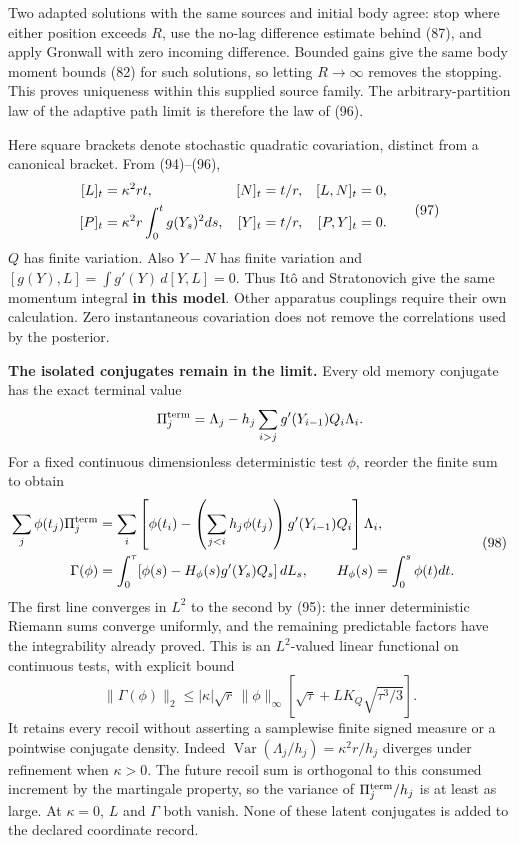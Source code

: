 \documentclass[11pt,a4paper]{article}
\begin{document}
Two adapted solutions with the same sources and initial body agree: stop
where either position exceeds \(R\), use the no-lag difference estimate
behind (87), and apply Gronwall with zero incoming difference. Bounded
gains give the same body moment bounds (82) for such solutions, so
letting \(R\to\infty\) removes the stopping. This proves uniqueness
within this supplied source family. The arbitrary-partition law of the
adaptive path limit is therefore the law of (96).

Here square brackets denote stochastic quadratic covariation, distinct
from a canonical bracket. From (94)--(96), \[\begin{aligned}
\relax[L]_t&=\kappa^2rt,&[N]_t&=t/r,&[L,N]_t&=0,\\
[P]_t&=\kappa^2r\int_0^t g(Y_s)^2ds,&
[Y]_t&=t/r,&[P,Y]_t&=0.
\end{aligned}\tag{97}\] \(Q\) has finite variation. Also \(Y-N\) has
finite variation and \([g(Y),L]=\int g'(Y)\,d[Y,L]=0\). Thus Itô and
Stratonovich give the same momentum integral \textbf{in this model}.
Other apparatus couplings require their own calculation. Zero
instantaneous covariation does not remove the correlations used by the
posterior.

\textbf{The isolated conjugates remain in the limit.} Every old memory
conjugate has the exact terminal value \[\Pi_j^{\rm term}=\Lambda_j-
 h_j\sum_{i>j}g'(Y_{i-1})Q_i\Lambda_i.\] For a fixed continuous
dimensionless deterministic test \(\phi\), reorder the finite sum to
obtain \[\begin{aligned}
\sum_j\phi(t_j)\Pi_j^{\rm term}
 &=\sum_i\left[\phi(t_i)-
 \left(\sum_{j<i}h_j\phi(t_j)\right)g'(Y_{i-1})Q_i\right]\Lambda_i,\\
\Gamma(\phi)&=\int_0^\tau
 [\phi(s)-H_\phi(s)g'(Y_s)Q_s]\,dL_s,
 \qquad H_\phi(s)=\int_0^s\phi(t)dt.
\end{aligned}\tag{98}\] The first line converges in \(L^2\) to the
second by (95): the inner deterministic Riemann sums converge uniformly,
and the remaining predictable factors have the integrability already
proved. This is an \(L^2\)-valued linear functional on continuous tests,
with explicit bound
\[\|\Gamma(\phi)\|_2\le|\kappa|\sqrt r\,\|\phi\|_\infty
 \left[\sqrt\tau+LK_Q\sqrt{\tau^3/3}\right].\] It retains every recoil
without asserting a samplewise finite signed measure or a pointwise
conjugate density. Indeed
\(\operatorname{Var}(\Lambda_j/h_j)=\kappa^2r/h_j\) diverges under
refinement when \(\kappa>0\). The future recoil sum is orthogonal to
this consumed increment by the martingale property, so the variance of
\(\Pi_j^{\rm term}/h_j\) is at least as large. At \(\kappa=0\), \(L\)
and \(\Gamma\) both vanish. None of these latent conjugates is added to
the declared coordinate record.
\end{document}
